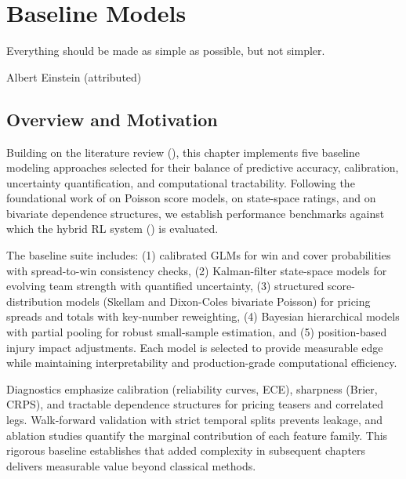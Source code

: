 \chapter{Baseline Models}
\label{chap:methods}

\epigraph{Everything should be made as simple as possible, but not simpler.}{Albert Einstein (attributed)}


\section*{Overview and Motivation}
Building on the literature review (), this chapter implements five baseline modeling approaches selected for their balance of predictive accuracy, calibration, uncertainty quantification, and computational tractability. Following the foundational work of \citet{harville1980} on Poisson score models, \citet{glickman1998} on state-space ratings, and \citet{dixon1997} on bivariate dependence structures, we establish performance benchmarks against which the hybrid RL system () is evaluated.

The baseline suite includes: (1) calibrated GLMs for win and cover probabilities with spread-to-win consistency checks, (2) Kalman-filter state-space models for evolving team strength with quantified uncertainty, (3) structured score-distribution models (Skellam and Dixon-Coles bivariate Poisson) for pricing spreads and totals with key-number reweighting, (4) Bayesian hierarchical models with partial pooling for robust small-sample estimation, and (5) position-based injury impact adjustments. Each model is selected to provide measurable edge while maintaining interpretability and production-grade computational efficiency.

Diagnostics emphasize calibration (reliability curves, ECE), sharpness (Brier, CRPS), and tractable dependence structures for pricing teasers and correlated legs. Walk-forward validation with strict temporal splits prevents leakage, and ablation studies quantify the marginal contribution of each feature family. This rigorous baseline establishes that added complexity in subsequent chapters delivers measurable value beyond classical methods.

